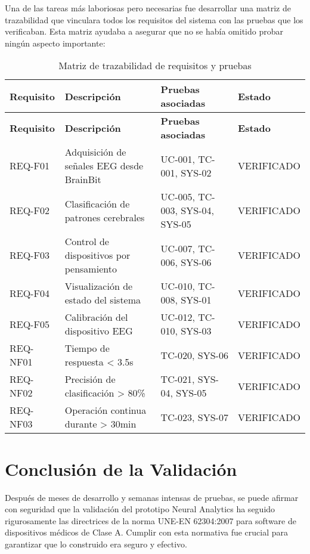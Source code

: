 Una de las tareas más laboriosas pero necesarias fue desarrollar una matriz de trazabilidad que vinculara todos los requisitos del sistema con las pruebas que los verificaban. Esta matriz ayudaba a asegurar que no se había omitido probar ningún aspecto importante:


\begin{center}
\small
\begin{longtable}{|p{2.5cm}|p{5.5cm}|p{3.5cm}|p{2.5cm}|}
    \caption{Matriz de trazabilidad de requisitos y pruebas}\label{tab:traceability} \\
    \hline
    \textbf{Requisito} & \textbf{Descripción} & \textbf{Pruebas asociadas} & \textbf{Estado} \\
    \hline
    \endfirsthead
    \hline
    \textbf{Requisito} & \textbf{Descripción} & \textbf{Pruebas asociadas} & \textbf{Estado} \\
    \hline
    \endhead
    REQ-F01 & Adquisición de señales EEG desde BrainBit & UC-001, TC-001, SYS-02 & VERIFICADO \\
    \hline
    REQ-F02 & Clasificación de patrones cerebrales & UC-005, TC-003, SYS-04, SYS-05 & VERIFICADO \\
    \hline
    REQ-F03 & Control de dispositivos por pensamiento & UC-007, TC-006, SYS-06 & VERIFICADO \\
    \hline
    REQ-F04 & Visualización de estado del sistema & UC-010, TC-008, SYS-01 & VERIFICADO \\
    \hline
    REQ-F05 & Calibración del dispositivo EEG & UC-012, TC-010, SYS-03 & VERIFICADO \\
    \hline
    REQ-NF01 & Tiempo de respuesta < 3.5s & TC-020, SYS-06 & VERIFICADO \\
    \hline
    REQ-NF02 & Precisión de clasificación > 80\% & TC-021, SYS-04, SYS-05 & VERIFICADO \\
    \hline
    REQ-NF03 & Operación continua durante > 30min & TC-023, SYS-07 & VERIFICADO \\
    \hline
\end{longtable}
\end{center}

\newpage
\section{Conclusión de la Validación}

Después de meses de desarrollo y semanas intensas de pruebas, se puede afirmar con seguridad que la validación del prototipo Neural Analytics ha seguido rigurosamente las directrices de la norma UNE-EN 62304:2007 para software de dispositivos médicos de Clase A. Cumplir con esta normativa fue crucial para garantizar que lo construido era seguro y efectivo.

